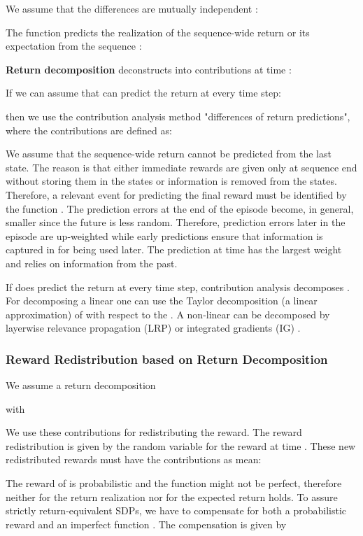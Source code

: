 \documentclass{article}
\begin{document}
\begin{appendices}
We assume that the differences  
are mutually independent \cite{Hyvarinen:01}:

The function  predicts the realization of the sequence-wide
return or its expectation from the sequence :
 
{\bf Return decomposition} deconstructs  into contributions
 at time :
 
If we can assume that  can predict the return at every time step:
 
then we use the contribution analysis method "differences of return predictions",
where the contributions are defined as:
 

We assume that the sequence-wide return cannot be predicted from the
last state. The reason is that either immediate rewards are given only 
at sequence end without storing them in the states 
or information is removed from the states.
Therefore, a relevant event for predicting the final reward must be identified by
the function . 
The prediction errors at the end of the episode become, in general, smaller since the
future is less random. Therefore, prediction errors later 
in the episode are up-weighted while early predictions ensure that information is
captured in  for being used later.
The prediction at time  has the largest weight and 
relies on information from the past.

If  does predict the return at every time step,
contribution analysis decomposes .
For decomposing a linear  one can use the Taylor decomposition 
(a linear approximation) of  with respect to the 
\cite{Bach:15,Montavon:17taylor}.
A non-linear  can be decomposed by 
layerwise relevance propagation (LRP)
\cite{Bach:15,Montavon:17} or integrated gradients (IG)
\cite{Sundararajan:17}.


\subsubsection{Reward Redistribution based on Return Decomposition}

We assume a return decomposition
 
with
 
We use these contributions for redistributing the reward. 
The reward redistribution is given by 
the random variable  for the reward at time .
These new redistributed rewards
 must have the contributions  as mean:
 

The reward  of 
is probabilistic and 
the function  might not be perfect,
therefore neither  for the return
realization  nor
 for the expected return
holds.
To assure strictly return-equivalent SDPs,
we have to compensate for both a probabilistic reward  
and an imperfect function .
The compensation is given by
 

\end{appendices}
\end{document}
